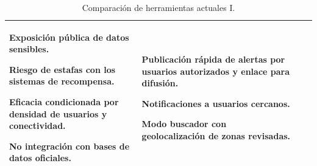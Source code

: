 \begin{table}[htbp]
\begin{tabular}{ |m{2cm}|m{5cm}|m{4cm}|m{3cm}|  }
{    Exposición pública de datos sensibles.
    
    Riesgo de estafas con los sistemas de recompensa.
    
    Eficacia condicionada por densidad de usuarios y conectividad.
    
    No integración con bases de datos oficiales.
    }
    & {Publicación rápida de alertas por usuarios autorizados y enlace para difusión.
    
    Notificaciones a usuarios cercanos.
    
    Modo buscador con geolocalización de zonas revisadas.
    }\\
\hline
\end{tabular}
\caption{Comparación de herramientas actuales I.\label{tabla:TablaComparativaI}
}
\end{table}



